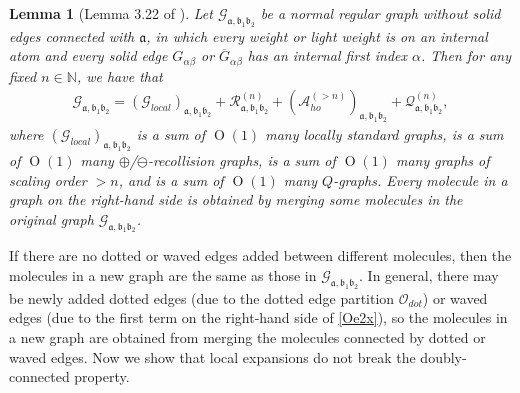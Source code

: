 \documentclass{article}
\newcommand{\1}{\mathds{1}}
\numberwithin{equation}{section}
\newcommand{\al}{\alpha}
\newcommand{\fa}{{\mathfrak a}}
\newcommand{\fb}{{\mathfrak b}}
\renewcommand{\cal}{\mathcal}
\newcommand{\N}{\mathbb{N}}
\DeclareMathOperator{\OO}{O}
\theoremstyle{plain} %
\newtheorem{lemma}[theorem]{Lemma}
\theoremstyle{remark}
\newtheorem{remark}[theorem]{Remark}
\newcommand{\PGn}{\mathcal R^{(n)}}
\newcommand{\AGn}{\mathcal A^{(>n)}_{ho}}
\newcommand{\QGn}{\mathcal Q^{(n)}}
\begin{document}
\begin{lemma}[Lemma 3.22 of \cite{PartI_high}] \label{lvl1 lemma}
Let $\cal G_{\fa, \fb_1\fb_2}$ be a normal regular graph without solid edges connected with $\fa$, in which every weight or light weight is on an internal atom and every solid edge $G_{\al\beta}$ or $\overline G_{\al\beta}$ has an internal first index $\al$. Then for any fixed $n\in \N$, we have that
\begin{align}\label{expand lvl1}
\cal G_{\fa, \fb_1\fb_2} =  (\cal G_{local})_{\fa, \fb_1\fb_2}  + \PGn_{\fa,\fb_1\fb_2} +  (\AGn)_{\fa,\fb_1\fb_2} + \QGn_{\fa,\fb_1\fb_2} ,
\end{align}
where $(\cal G_{local})_{\fa, \fb_1\fb_2} $ is a sum of $\OO(1)$ many locally standard graphs, \smash{$ \PGn_{\fa,\fb_1\fb_2} $} is a sum of $\OO(1)$ many $\oplus$/$\ominus$-recollision graphs, \smash{$(\AGn)_{\fa,\fb_1\fb_2}$} is a sum of $\OO(1)$ many graphs of scaling order $> n$, and \smash{$(\QGn)_{\fa,\fb_1\fb_2} $} is a sum of $\OO(1)$ many $Q$-graphs.  Every molecule in a graph on the right-hand side is obtained by merging some molecules in the original graph $\cal G_{\fa, \fb_1\fb_2}$. 
\end{lemma}


If there are no dotted or waved edges added  between different molecules, then the molecules in a new graph are the same as those  in $\cal G_{\fa, \fb_1\fb_2}$. In general, there may be newly added dotted edges (due to the dotted edge partition $\cal O_{dot}$) or waved edges (due to the first term on the right-hand side of \eqref{Oe2x}), so the molecules in a new graph are obtained from merging the molecules connected by dotted or waved edges. Now we show that local expansions do not break the doubly-connected property.
\end{document}

